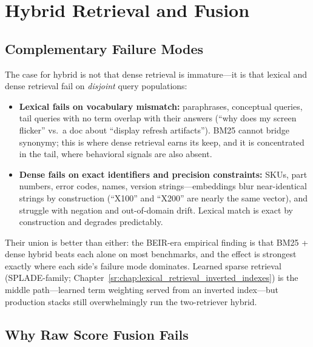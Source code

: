 \section{Hybrid Retrieval and Fusion}
\label{sr:sec:hybrid_fusion}

\subsection{Complementary Failure Modes}

The case for hybrid is not that dense retrieval is immature---it is that lexical and dense retrieval fail on \textit{disjoint} query populations:

\begin{itemize}
    \item \textbf{Lexical fails on vocabulary mismatch:} paraphrases, conceptual queries, tail queries with no term overlap with their answers (``why does my screen flicker'' vs.\ a doc about ``display refresh artifacts''). BM25 cannot bridge synonymy; this is where dense retrieval earns its keep, and it is concentrated in the tail, where behavioral signals are also absent.
    \item \textbf{Dense fails on exact identifiers and precision constraints:} SKUs, part numbers, error codes, names, version strings---embeddings blur near-identical strings by construction (``X100'' and ``X200'' are nearly the same vector), and struggle with negation and out-of-domain drift. Lexical match is exact by construction and degrades predictably.
\end{itemize}

Their union is better than either: the BEIR-era empirical finding is that BM25 + dense hybrid beats each alone on most benchmarks, and the effect is strongest exactly where each side's failure mode dominates. Learned sparse retrieval (SPLADE-family; Chapter~\ref{sr:chap:lexical_retrieval_inverted_indexes}) is the middle path---learned term weighting served from an inverted index---but production stacks still overwhelmingly run the two-retriever hybrid.

\subsection{Why Raw Score Fusion Fails}
\label{sr:subsec:score_normalization}

